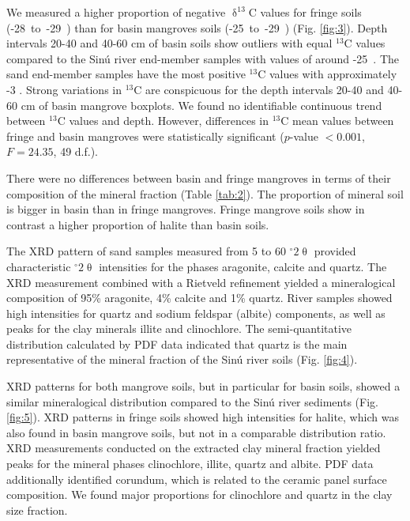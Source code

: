 We measured a higher proportion of negative $\updelta^{13}$C values for fringe soils \mbox{(-28 to -29 \permil)} than for basin mangroves soils \mbox{(-25 to -29 \permil)} (Fig. \ref{fig:3}).  Depth intervals 20-40 and 40-60 cm of basin soils show outliers with equal $^{13}$C values compared to the Sin\'{u} river end-member samples with values of around \mbox{-25 \permil}. The sand end-member samples have the most positive $^{13}$C values with approximately -3 \permil.  Strong variations in $^{13}$C are conspicuous for the depth intervals 20-40 and 40-60 cm of basin mangrove boxplots. We found no identifiable continuous trend between $^{13}$C values and depth. However, differences in $^{13}$C mean values between fringe and basin mangroves were statistically significant ($p$-value $< 0.001$, $F = 24.35$, 49 d.f.). 


There were no differences between basin and fringe mangroves in terms of their composition of the mineral fraction (Table \ref{tab:2}). The proportion of mineral soil is bigger in basin than in fringe mangroves. Fringe mangrove soils show in contrast a higher proportion of halite than basin soils.

The XRD pattern of sand samples measured from 5 to 60 $^{\circ}2\uptheta$ provided characteristic $^{\circ}2\uptheta$ intensities for the phases aragonite, calcite and quartz. The XRD measurement combined with a Rietveld refinement yielded a mineralogical composition of 95\% aragonite, 4\% calcite and 1\% quartz.
River samples showed high intensities for quartz and sodium feldspar (albite) components, as well as peaks for the clay minerals illite and clinochlore. The semi-quantitative distribution calculated by PDF data indicated that quartz is the main representative of the mineral fraction of the Sin\'{u} river soils (Fig. \ref{fig:4}).

XRD patterns for both mangrove soils, but in particular for basin soils, showed a similar mineralogical distribution compared to the Sin\'{u} river sediments (Fig. \ref{fig:5}). XRD patterns in fringe soils showed high intensities for halite, which was also found in basin mangrove soils, but not in a comparable distribution ratio.
XRD measurements conducted on the extracted clay mineral fraction yielded peaks for the mineral phases clinochlore, illite, quartz and albite. PDF data additionally identified corundum, which is related to the ceramic panel surface composition. We found major proportions for clinochlore and quartz in the clay size fraction. 

